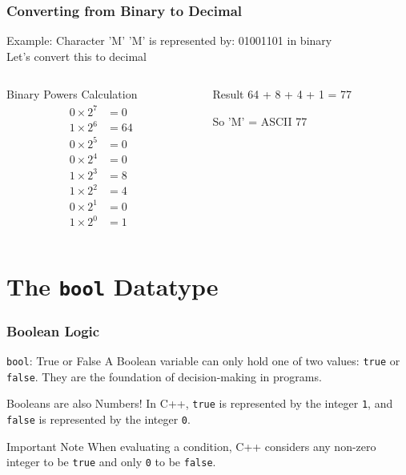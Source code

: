 \documentclass{beamer}
\begin{document}
\begin{frame}
\frametitle{Converting from Binary to Decimal}
\begin{alertblock}{Example: Character 'M'}
'M' is represented by: 01001101 in binary\\
Let's convert this to decimal
\end{alertblock}

\begin{columns}[T]
    \begin{column}{0.6\textwidth}
        \begin{block}{Binary Powers Calculation}
        \scriptsize
        \begin{align*}
        0 \times 2^7 &= 0 \\
        1 \times 2^6 &= 64 \\
        0 \times 2^5 &= 0 \\
        0 \times 2^4 &= 0 \\
        1 \times 2^3 &= 8 \\
        1 \times 2^2 &= 4 \\
        0 \times 2^1 &= 0 \\
        1 \times 2^0 &= 1
        \end{align*}
        \end{block}
    \end{column}
    \begin{column}{0.4\textwidth}
        \begin{exampleblock}{Result}
        \Large
        64 + 8 + 4 + 1 = 77
        
        So 'M' = ASCII 77
        \end{exampleblock}
    \end{column}
\end{columns}
\end{frame}


\section{The \texttt{bool} Datatype}

\begin{frame}
\frametitle{Boolean Logic}
\begin{block}{\texttt{bool}: True or False}
A Boolean variable can only hold one of two values: \texttt{true} or \texttt{false}. They are the foundation of decision-making in programs.
\end{block}\pause

\begin{alertblock}{Booleans are also Numbers!}
In C++, \texttt{true} is represented by the integer \texttt{1}, and \texttt{false} is represented by the integer \texttt{0}.
\end{alertblock}\pause

\begin{exampleblock}{Important Note}
When evaluating a condition, C++ considers any non-zero integer to be \texttt{true} and only \texttt{0} to be \texttt{false}.
\end{exampleblock}
\end{frame}
\end{document}
